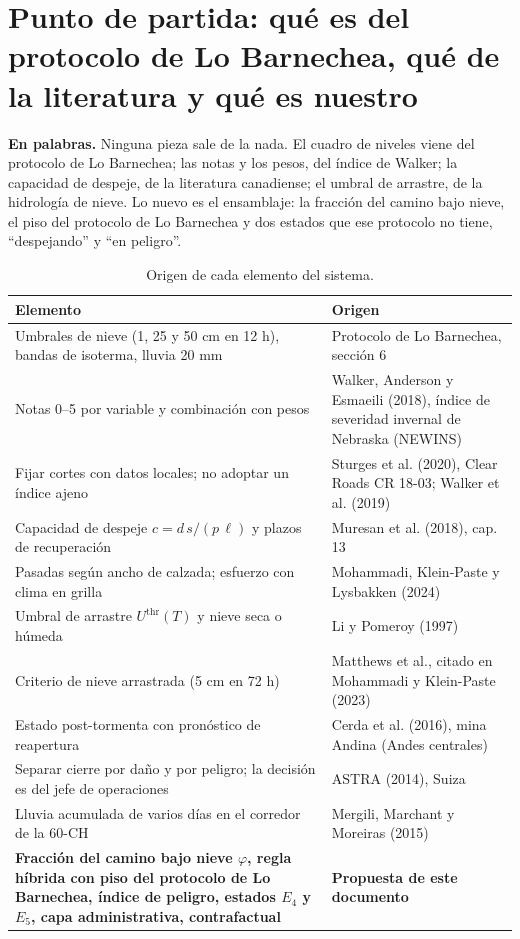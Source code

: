 \documentclass[11pt,a4paper]{article}
\newcommand{\enpalabras}[1]{%
  \par\smallskip\noindent\colorbox{caja}{\parbox{\dimexpr\linewidth-2\fboxsep}{\small\textbf{En palabras.} #1}}\par\smallskip}
\begin{document}
\section{Punto de partida: qué es del protocolo de Lo Barnechea, qué de la literatura y qué es nuestro}\label{sec:partida}

\enpalabras{Ninguna pieza sale de la nada. El cuadro de niveles viene del protocolo de Lo Barnechea; las notas y los pesos, del índice de Walker; la capacidad de despeje, de la literatura canadiense; el umbral de arrastre, de la hidrología de nieve. Lo nuevo es el ensamblaje: la fracción del camino bajo nieve, el piso del protocolo de Lo Barnechea y dos estados que ese protocolo no tiene, ``despejando'' y ``en peligro''.}

\begin{table}[H]
\centering\small
\caption{Origen de cada elemento del sistema.}
\label{tab:origen}
\begin{tabularx}{\textwidth}{|>{\raggedright\arraybackslash}p{4.3cm}|>{\raggedright\arraybackslash}X|}
\hline
Elemento & Origen \\ \hline
Umbrales de nieve (1, 25 y 50 cm en 12 h), bandas de isoterma, lluvia 20 mm & Protocolo de Lo Barnechea, sección 6 \\ \hline
Notas 0--5 por variable y combinación con pesos & Walker, Anderson y Esmaeili (2018), índice de severidad invernal de Nebraska (NEWINS) \\ \hline
Fijar cortes con datos locales; no adoptar un índice ajeno & Sturges et al. (2020), Clear Roads CR 18-03; Walker et al. (2019) \\ \hline
Capacidad de despeje $c = d\,s/(p\,\ell)$ y plazos de recuperación & Muresan et al. (2018), cap. 13 \\ \hline
Pasadas según ancho de calzada; esfuerzo con clima en grilla & Mohammadi, Klein-Paste y Lysbakken (2024) \\ \hline
Umbral de arrastre $U^{\mathrm{thr}}(T)$ y nieve seca o húmeda & Li y Pomeroy (1997) \\ \hline
Criterio de nieve arrastrada (5 cm en 72 h) & Matthews et al., citado en Mohammadi y Klein-Paste (2023) \\ \hline
Estado post-tormenta con pronóstico de reapertura & Cerda et al. (2016), mina Andina (Andes centrales) \\ \hline
Separar cierre por daño y por peligro; la decisión es del jefe de operaciones & ASTRA (2014), Suiza \\ \hline
Lluvia acumulada de varios días en el corredor de la 60-CH & Mergili, Marchant y Moreiras (2015) \\ \hline
\textbf{Fracción del camino bajo nieve $\varphi$, regla híbrida con piso del protocolo de Lo Barnechea, índice de peligro, estados $E_4$ y $E_5$, capa administrativa, contrafactual} & \textbf{Propuesta de este documento} \\ \hline
\end{tabularx}
\end{table}
\end{document}

